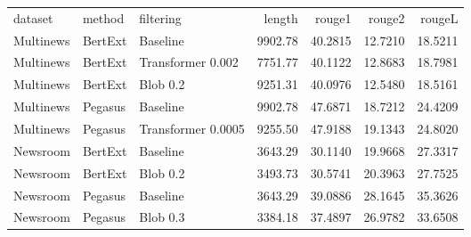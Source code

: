 \begin{tabular}{lllrrrr}
\toprule
  dataset &  method &          filtering &  length &  rouge1 &  rouge2 &  rougeL \\
Multinews & BertExt &           Baseline & 9902.78 & 40.2815 & 12.7210 & 18.5211 \\
\midrule
Multinews & BertExt &  Transformer 0.002 & 7751.77 & 40.1122 & 12.8683 & 18.7981 \\
Multinews & BertExt &           Blob 0.2 & 9251.31 & 40.0976 & 12.5480 & 18.5161 \\
Multinews & Pegasus &           Baseline & 9902.78 & 47.6871 & 18.7212 & 24.4209 \\
Multinews & Pegasus & Transformer 0.0005 & 9255.50 & 47.9188 & 19.1343 & 24.8020 \\
 Newsroom & BertExt &           Baseline & 3643.29 & 30.1140 & 19.9668 & 27.3317 \\
 Newsroom & BertExt &           Blob 0.2 & 3493.73 & 30.5741 & 20.3963 & 27.7525 \\
 Newsroom & Pegasus &           Baseline & 3643.29 & 39.0886 & 28.1645 & 35.3626 \\
 Newsroom & Pegasus &           Blob 0.3 & 3384.18 & 37.4897 & 26.9782 & 33.6508 \\
\bottomrule
\end{tabular}

